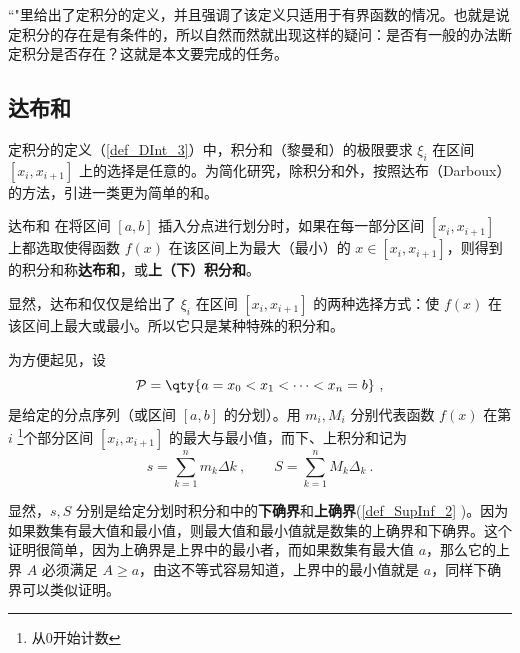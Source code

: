 
“"里给出了定积分的定义，并且强调了该定义只适用于有界函数的情况。也就是说定积分的存在是有条件的，所以自然而然就出现这样的疑问：是否有一般的办法断定积分是否存在？这就是本文要完成的任务。
\subsection{达布和}
定积分的定义（\autoref{def_DInt_3}）中，积分和（黎曼和）的极限要求 $\xi_i$ 在区间 $[x_i,x_{i+1}]$ 上的选择是任意的。为简化研究，除积分和外，按照达布（Darboux）的方法，引进一类更为简单的和。
\begin{definition}{达布和}
在将区间 $[a,b]$ 插入分点进行划分时，如果在每一部分区间 $[x_i,x_{i+1}]$ 上都选取使得函数 $f(x)$ 在该区间上为最大（最小）的 $x\in[x_i,x_{i+1}]$，则得到的积分和称\textbf{达布和}，或\textbf{上（下）积分和}。
\end{definition}
显然，达布和仅仅是给出了 $\xi_i$ 在区间 $[x_i,x_{i+1}]$ 的两种选择方式：使 $f(x)$ 在该区间上最大或最小。所以它只是某种特殊的积分和。

为方便起见，设
\begin{equation}
\mathcal P = \qty{a = x_0 < x_1 < \dots < x_n = b}~,
\end{equation}
是给定的分点序列（或区间 $[a,b]$ 的分划）。用 $m_i,M_i$ 分别代表函数 $f(x)$ 在第 $i$ \footnote{从0开始计数}个部分区间 $[x_i,x_{i+1}]$ 的最大与最小值，而下、上积分和记为
\begin{equation}
s= \sum_{k = 1}^n m_k\Delta k~, \qquad  S = \sum_{k = 1}^n M_k \Delta_k~.
\end{equation}

显然，$s,S$ 分别是给定分划时积分和中的\textbf{下确界}和\textbf{上确界}(\autoref{def_SupInf_2} )。因为如果数集有最大值和最小值，则最大值和最小值就是数集的上确界和下确界。这个证明很简单，因为上确界是上界中的最小者，而如果数集有最大值 $a$，那么它的上界 $A$ 必须满足 $A\geq a$，由这不等式容易知道，上界中的最小值就是 $a$，同样下确界可以类似证明。
